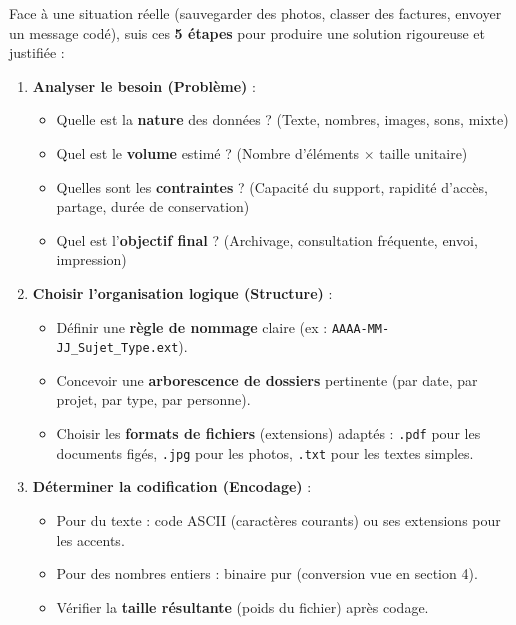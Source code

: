 \documentclass[11pt]{article}
\newcommand{\cle}[1]{{\popxbold\color{popdark}#1}}
\begin{document}
\begin{methode}
Face à une situation réelle (sauvegarder des photos, classer des factures, envoyer un message codé), suis ces \textbf{5 étapes} pour produire une solution rigoureuse et justifiée :

\begin{enumerate}
    \item \textbf{Analyser le besoin (Problème)} :
    \begin{itemize}
        \item Quelle est la \textbf{nature} des données ? (Texte, nombres, images, sons, mixte)
        \item Quel est le \textbf{volume} estimé ? (Nombre d'éléments $\times$ taille unitaire)
        \item Quelles sont les \textbf{contraintes} ? (Capacité du support, rapidité d'accès, partage, durée de conservation)
        \item Quel est l'\textbf{objectif final} ? (Archivage, consultation fréquente, envoi, impression)
    \end{itemize}

    \item \textbf{Choisir l'organisation logique (Structure)} :
    \begin{itemize}
        \item Définir une \textbf{règle de nommage} claire (ex : \texttt{AAAA-MM-JJ\_Sujet\_Type.ext}).
        \item Concevoir une \textbf{arborescence de dossiers} pertinente (par date, par projet, par type, par personne).
        \item Choisir les \textbf{formats de fichiers} (extensions) adaptés : \texttt{.pdf} pour les documents figés, \texttt{.jpg} pour les photos, \texttt{.txt} pour les textes simples.
    \end{itemize}

    \item \textbf{Déterminer la codification (Encodage)} :
    \begin{itemize}
        \item Pour du texte : code \cle{ASCII} (caractères courants) ou ses extensions pour les accents.
        \item Pour des nombres entiers : binaire pur (conversion vue en section 4).
        \item Vérifier la \textbf{taille résultante} (poids du fichier) après codage.
    \end{itemize}


\end{enumerate}
\end{methode}
\end{document}
